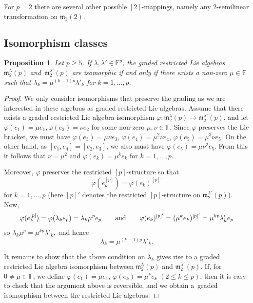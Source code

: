 \documentclass[pdftex]{sigma}
\def\phi{\varphi}
\def\m{\mathfrak m}
\def\F{\mathbb F}
\numberwithin{equation}{section}
\newtheorem{Proposition}[Theorem]{Proposition}
 { \theoremstyle{definition}
\newtheorem{Remark}[Theorem]{Remark} }
\begin{document}
\begin{Remark} For $p=2$ there are several other possible $[2]$-mappings, namely any 2-semilinear transformation on $\m_2(2)$.
\end{Remark}

\subsection{Isomorphism classes}

\begin{Proposition} Let $p\geq 5$. If $\lambda,\lambda'\in\F^p$, the graded restricted Lie algebras~$\m_2^{\lambda}(p)$ and~$\m_2^{\lambda'}(p)$ are isomorphic if and only if there exists a non-zero $\mu\in\F$ such that $\lambda_k=\mu^{(k-1)p}\lambda'_k$ for $k=1,\dots,p$.
\end{Proposition}

\begin{proof} We only consider isomorphisms that preserve the grading as we are
 interested in these algebras as graded restricted Lie
 algebras. Assume that there exists a graded restricted Lie algebra
 isomorphism $\phi\colon \m_2^{\lambda}(p) \to \m_2^{\lambda'}(p)$, and
 let $\phi(e_1)=\mu e_1, \phi(e_2)=\nu e_2$ for some non-zero
 $\mu, \nu \in \F$. Since $\phi$ preserves the Lie bracket, we must
 have $\phi(e_3)=\mu\nu e_3$, $\phi(e_4)=\mu^2\nu e_4$,
 $\phi(e_5)=\mu^3\nu e_5$. On the other hand, as
 $[e_1, e_4] = [e_2,e_3]$, we also must have
 $\phi(e_5)=\mu\nu^2 e_5$. From this it follows that $\nu=\mu^2$ and
 $\phi(e_k)=\mu^k e_k$ for $k=1,\dots, p$.

 Moreover, $\phi$ preserves the restricted $[p]$-structure so that
 \[
 \phi(e_k^{[p]})=\phi(e_k)^{[p]'}
 \]
 for $k=1,\dots, p$ (here $[p]'$ denotes the restricted $[p]$-structure on
 $\m_2^{\lambda'}(p)$). Now,
 \[
 \phi(e_k^{[p]})=\phi(\lambda_k e_p)=\lambda_k\mu^p e_p\qquad {\rm and}\qquad \phi(e_k)^{[p]'}=(\mu^k e_k)^{[p]'}=\mu^{kp}\lambda_k' e_p
 \]
 so $\lambda_k\mu^p=\mu^{kp}\lambda'_k,$ and hence
 \[
 \lambda_k=\mu^{(k-1)p}\lambda'_k.
 \]

It remains to show that the above condition on $\lambda_k$ gives rise to a graded restricted Lie algebra isomorphism between $\m_2^{\lambda}(p)$ and $\m_2^{\lambda'}(p)$. If, for $0\ne \mu\in\F$, we define $\phi(e_1)=\mu e_1$, $\phi(e_k)=\mu^k e_k$ $(2\le k\le p)$, then it is easy to check that the argument above is reversible, and we obtain a~graded isomorphism between the restricted Lie algebras.
\end{proof}
\end{document}
